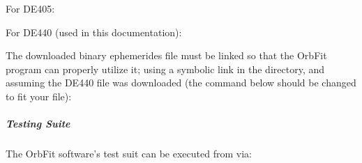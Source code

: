 \documentclass[letterpaper,11pt,english]{sphinxmanual}
\begin{document}
\sphinxAtStartPar
For DE405:

\begin{sphinxVerbatim}[commandchars=\\\{\}]
  
\end{sphinxVerbatim}

\sphinxAtStartPar
For DE440 (used in this documentation):

\begin{sphinxVerbatim}[commandchars=\\\{\}]
  
\end{sphinxVerbatim}

\sphinxAtStartPar
The downloaded binary ephemerides file must be linked so that the OrbFit
program can properly utilize it; using a symbolic link in the
 directory, and assuming the DE440 file was downloaded (the
command below should be changed to fit your file):

\begin{sphinxVerbatim}[commandchars=\\\{\}]
 
   
 
\end{sphinxVerbatim}


\subparagraph{Testing Suite}
\label{\detokenize{technical/installation/orbfit:testing-suite}}
\sphinxAtStartPar
The OrbFit software’s test suit can be executed from  via:

\begin{sphinxVerbatim}[commandchars=\\\{\}]
 
\end{sphinxVerbatim}
\end{document}
